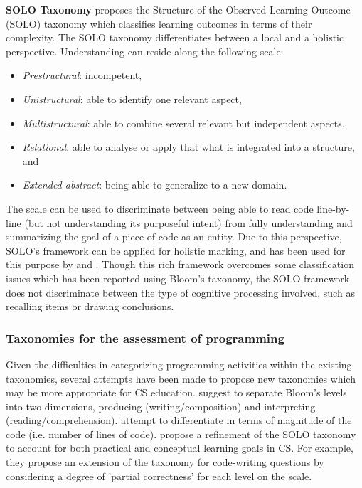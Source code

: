 \noindent \textbf{SOLO Taxonomy}\newline
{} proposes the Structure of the Observed Learning Outcome (SOLO) taxonomy which classifies learning outcomes in terms of their complexity. The SOLO taxonomy differentiates between a local and a holistic perspective. Understanding can reside along the following scale:
\begin{itemize}
\item \emph{Prestructural}: incompetent,
\item \emph{Unistructural}: able to identify one relevant aspect,
\item \emph{Multistructural}: able to combine several relevant but independent aspects,
\item \emph{Relational}: able to analyse or apply that what is integrated into a structure, and
\item \emph{Extended abstract}: being able to generalize to a new domain.
\end{itemize}


The scale can be used to discriminate between being able to read code line-by-line (but not understanding its purposeful intent) from fully understanding and summarizing the goal of a piece of code as an entity. Due to this perspective, SOLO's framework can be applied for holistic marking, and has been used for this purpose by  and . Though this rich framework  overcomes some classification issues which has been reported using Bloom's taxonomy, the SOLO framework does not discriminate between the type of cognitive processing involved, such as recalling items or drawing conclusions.



\subsubsection{Taxonomies for the assessment of programming}\label{sec:taxProgramming}


Given the difficulties in categorizing programming activities within the existing taxonomies, several attempts have been made to propose new taxonomies which may be more appropriate for CS education.  suggest to separate Bloom's levels into two dimensions, producing (writing/composition) and interpreting (reading/comprehension).  attempt to differentiate in terms of magnitude of the code (i.e. number of lines of code).  propose a refinement of the SOLO taxonomy to account for both practical and conceptual learning goals in CS. For example, they propose an extension of the taxonomy for code-writing questions by considering a degree of 'partial correctness' for each level on the scale.


